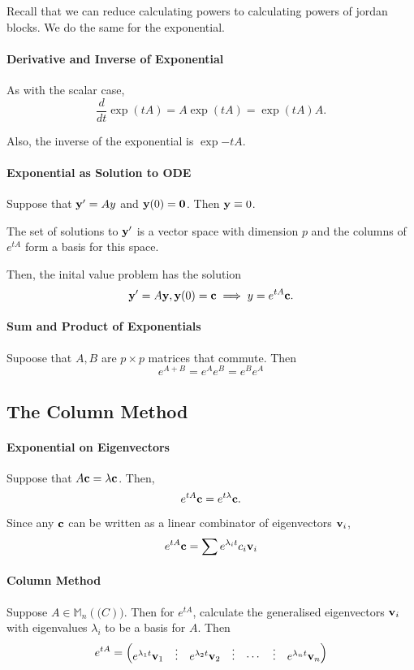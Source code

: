 Recall that we can reduce calculating powers to calculating
powers of jordan blocks. We do the same for the exponential.


\paragraph{Derivative and Inverse of Exponential}
As with the scalar case, \[
    \frac{d}{dt}\exp(tA) = A \exp(tA) = \exp(tA) A
.\]

Also, the inverse of the exponential is \( \exp{-t A} \).

\paragraph{Exponential as Solution to ODE}
Suppose that \( \mathbf{y}' = Ay \) and \( \mathbf{y}(0) = \mathbf{0} \). Then
\( \mathbf{y} \equiv 0 \).

The set of solutions to \( \mathbf{y}' \) is a vector space with dimension
\( p \) and the columns of \( e^{tA} \) form a basis for this space.

Then, the inital value problem has the solution \[
    \mathbf{y}' = A\mathbf{y}, \mathbf{y}(0) = \mathbf{c} \implies y =   e^{tA} \mathbf{c}
.\]

\paragraph{Sum and Product of Exponentials}
Supoose that \( A, B \) are \( p\times p \) matrices that commute.
Then \[
    e^{A + B} = e^A e^B = e^B e^A
\]


\subsection{The Column Method}

\paragraph{Exponential on Eigenvectors}
Suppose that \( A \mathbf{c} = \lambda \mathbf{c} \).
Then, \[
    e^{tA} \mathbf{c} = e^{t \lambda} \mathbf{c}.
\]

Since any \( \mathbf{c} \) can be written as a linear combinator of eigenvectors \( \mathbf{v}_i \), \[
    e^{tA} \mathbf{c} = \sum e^{\lambda_i t} c_i \mathbf{v}_i
\]

\paragraph{Column Method}
Suppose \( A \in \mathbb{M}_n(\mathbb(C)) \).
Then for \( e^{tA} \), calculate the generalised eigenvectors
\( \mathbf{v}_i \) with eigenvalues \( \lambda_i \) to be a basis for
\( A \). Then \[
    e^{tA} = \begin{pmatrix}
        e^{\lambda_1 t} \mathbf{v}_1
        & \vdots
        & e^{\lambda_2 t} \mathbf{v}_2
        & \vdots
        & \cdots
        & \vdots
        & e^{\lambda_n t} \mathbf{v}_n
    \end{pmatrix}
\]


